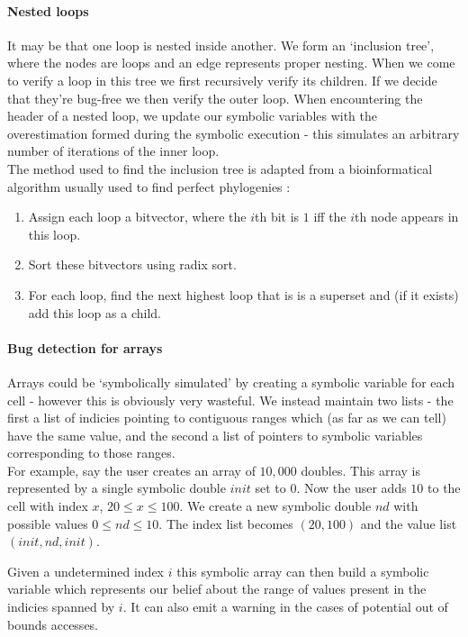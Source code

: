 \documentclass[12pt,a4paper]{article}
\begin{document}
\paragraph{Nested loops}
It may be that one loop is nested inside another. We form an `inclusion tree', where the nodes are loops and an edge represents proper nesting. When we come to verify a loop in this tree we first recursively verify its children.
If we decide that they're bug-free we then verify the outer loop. When encountering the header of a nested loop, we update our symbolic variables with the overestimation formed during
the symbolic execution - this simulates an arbitrary number of iterations of the inner loop.\\

The method used to find the inclusion tree is adapted from a bioinformatical algorithm usually used to find perfect phylogenies \citep{gusfield}:

\begin{enumerate}
\item Assign each loop a bitvector, where the $i$th bit is $1$ iff the $i$th node appears in this loop.
\item Sort these bitvectors using radix sort.
\item For each loop, find the next highest loop that is is a superset and (if it exists) add this loop as a child. 
\end{enumerate}

\paragraph{Bug detection for arrays}
Arrays could be `symbolically simulated' by creating a symbolic variable for each cell - however this is obviously very wasteful. We instead maintain two lists - 
the first a list of indicies pointing to contiguous ranges which (as far as we can tell) have the same value, and the second a list of pointers to symbolic variables corresponding to those ranges.\\
For example, say the user creates an array of $10,000$ doubles. This array is represented
by a single symbolic double $init$ set to 0. Now the user adds $10$ to the cell with index $x$, $20 \leq x \leq 100$. We create a new symbolic double $nd$ with possible values $0 \leq nd \leq 10$.
The index list becomes $(20, 100)$ and the value list $(init, nd, init)$.

Given a undetermined index $i$ this symbolic array can then build a symbolic variable which represents our belief about the range of values present in the indicies spanned by $i$. It
can also emit a warning in the cases of potential out of bounds accesses.
\end{document}

